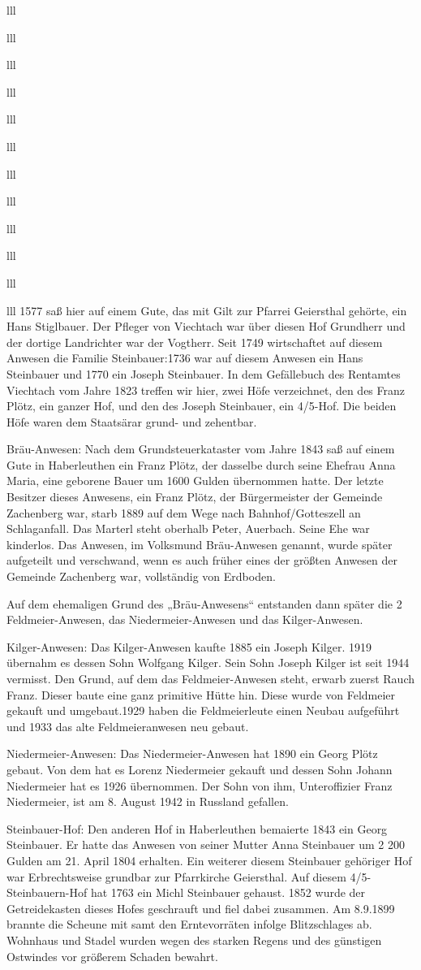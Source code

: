 \documentclass[12pt,a4pager]{book}
\begin{document}
\begin{tabuluar}{lll}
\begin{tabuluar}{lll}
\begin{tabuluar}{lll}
\begin{tabuluar}{lll}
\begin{tabuluar}{lll}
\begin{tabuluar}{lll}
\begin{tabuluar}{lll}
\begin{tabuluar}{lll}
\begin{tabuluar}{lll}
\begin{tabuluar}{lll}
\begin{tabuluar}{lll}
\begin{tabuluar}{lll}
1577 saß hier auf einem Gute, das mit Gilt zur Pfarrei Geiersthal gehörte, ein
Hans Stiglbauer. Der Pfleger von Viechtach war über diesen Hof Grundherr und der
dortige Landrichter war der Vogtherr. Seit 1749 wirtschaftet auf diesem Anwesen
die Familie Steinbauer:1736 war auf diesem Anwesen ein Hans Steinbauer und 1770
ein Joseph Steinbauer. In dem Gefällebuch des Rentamtes Viechtach vom Jahre 1823
treffen wir hier, zwei Höfe verzeichnet, den des Franz Plötz, ein ganzer Hof,
und den des Joseph Steinbauer, ein 4/5-Hof. Die beiden Höfe waren dem Staatsärar
grund- und zehentbar.

Bräu-Anwesen: Nach dem Grundsteuerkataster vom Jahre 1843 saß auf einem Gute in
Haberleuthen ein Franz Plötz, der dasselbe durch seine Ehefrau Anna Maria, eine
geborene Bauer um 1600 Gulden übernommen hatte. Der letzte Besitzer dieses
Anwesens, ein Franz Plötz, der Bürgermeister der Gemeinde Zachenberg war, starb
1889 auf dem Wege nach Bahnhof/Gotteszell an Schlaganfall. Das Marterl steht
oberhalb Peter, Auerbach. Seine Ehe war kinderlos. Das Anwesen, im Volksmund
Bräu-Anwesen genannt, wurde später aufgeteilt und verschwand, wenn es auch
früher eines der größten Anwesen der Gemeinde Zachenberg war, vollständig von
Erdboden.

Auf dem ehemaligen Grund des „Bräu-Anwesens“ entstanden dann später die 2
Feldmeier-Anwesen, das Niedermeier-Anwesen und das Kilger-Anwesen.

Kilger-Anwesen: Das Kilger-Anwesen kaufte 1885 ein Joseph Kilger. 1919 übernahm
es dessen Sohn Wolfgang Kilger. Sein Sohn Joseph Kilger ist seit 1944 vermisst.
Den Grund, auf dem das Feldmeier-Anwesen steht, erwarb zuerst Rauch Franz.
Dieser baute eine ganz primitive Hütte hin. Diese wurde von Feldmeier gekauft
und umgebaut.1929 haben die Feldmeierleute einen Neubau aufgeführt und 1933 das
alte Feldmeieranwesen neu gebaut.

Niedermeier-Anwesen: Das Niedermeier-Anwesen hat 1890 ein Georg Plötz gebaut.
Von dem hat es Lorenz Niedermeier gekauft und dessen Sohn Johann Niedermeier hat
es 1926 übernommen. Der Sohn von ihm, Unteroffizier Franz Niedermeier, ist am 8.
August 1942 in Russland gefallen.

Steinbauer-Hof: Den anderen Hof in Haberleuthen bemaierte 1843 ein Georg
Steinbauer. Er hatte das Anwesen von seiner Mutter Anna Steinbauer um 2 200
Gulden am 21. April 1804 erhalten. Ein weiterer diesem Steinbauer gehöriger Hof
war Erbrechtsweise grundbar zur Pfarrkirche Geiersthal. Auf diesem
4/5-Steinbauern-Hof hat 1763 ein Michl Steinbauer gehaust. 1852 wurde der
Getreidekasten dieses Hofes geschrauft und fiel dabei zusammen. Am 8.9.1899
brannte die Scheune mit samt den Erntevorräten infolge Blitzschlages ab.
Wohnhaus und Stadel wurden wegen des starken Regens und des günstigen Ostwindes
vor größerem Schaden bewahrt.


\end{tabuluar}
\end{tabuluar}
\end{tabuluar}
\end{tabuluar}
\end{tabuluar}
\end{tabuluar}
\end{tabuluar}
\end{tabuluar}
\end{tabuluar}
\end{tabuluar}
\end{tabuluar}
\end{tabuluar}
\end{document}

